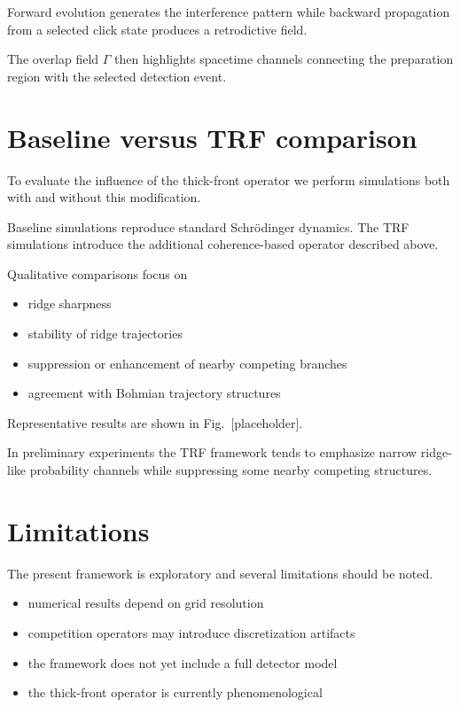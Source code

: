 \documentclass[aps,prl,reprint]{revtex4-2}
\begin{document}
Forward evolution generates the interference pattern while
backward propagation from a selected click state produces a
retrodictive field.

The overlap field $\Gamma$ then highlights spacetime channels
connecting the preparation region with the selected detection
event.



\section{Baseline versus TRF comparison}

To evaluate the influence of the thick-front operator we perform
simulations both with and without this modification.

Baseline simulations reproduce standard Schr\"odinger dynamics.
The TRF simulations introduce the additional coherence-based
operator described above.

Qualitative comparisons focus on

\begin{itemize}

\item ridge sharpness

\item stability of ridge trajectories

\item suppression or enhancement of nearby competing branches

\item agreement with Bohmian trajectory structures

\end{itemize}

Representative results are shown in
Fig.~[placeholder].

In preliminary experiments the TRF framework tends to emphasize
narrow ridge-like probability channels while suppressing some
nearby competing structures.



\section{Limitations}

The present framework is exploratory and several limitations
should be noted.

\begin{itemize}

\item numerical results depend on grid resolution

\item competition operators may introduce discretization artifacts

\item the framework does not yet include a full detector model

\item the thick-front operator is currently phenomenological

\end{itemize}
\end{document}
